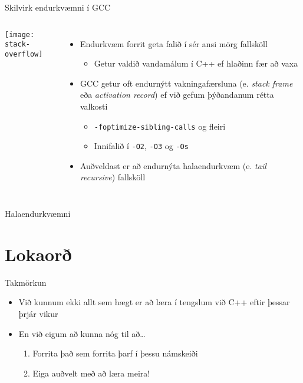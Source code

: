\documentclass[handout]{beamer}
\begin{document}
\begin{frame}{Skilvirk endurkvæmni í GCC}
\begin{columns}
\begin{center}
\texttt{[image: stack-overflow]}
\end{center}
\begin{itemize}
 \item Endurkvæm forrit geta falið í sér ansi mörg fallsköll
 \begin{itemize}
  \item Getur valdið vandamálum í C++ ef hlaðinn fær að vaxa\pause
 \end{itemize}
 \item GCC getur oft endurnýtt vakningafærsluna (e. \emph{stack frame} eða \emph{activation record}) ef við gefum þýðandanum rétta valkosti
 \begin{itemize}
  \item \texttt{-foptimize-sibling-calls} og fleiri
  \item Innifalið í \texttt{-O2}, \texttt{-O3} og \texttt{-Os}
 \end{itemize}
 \item Auðveldast er að endurnýta halaendurkvæm (e. \emph{tail recursive}) fallsköll
\end{itemize}
\end{columns}
\end{frame}

\begin{frame}{Halaendurkvæmni}
\end{frame}

\section{Lokaorð}

\begin{frame}{Takmörkun}
\begin{itemize}
 \item Við kunnum ekki allt sem hægt er að læra í tengslum við C++ eftir þessar þrjár vikur
 \item En við eigum að kunna nóg til að\ldots
 \begin{enumerate}
  \item Forrita það sem forrita þarf í þessu námskeiði
  \item Eiga auðvelt með að læra meira!
 \end{enumerate}
\end{itemize}
\end{frame}
\end{document}
